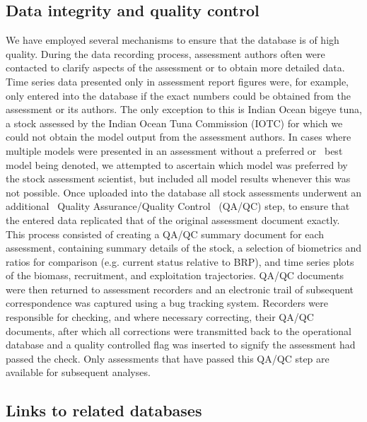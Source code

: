 \documentclass[letterpaper,review,authoryear,12pt]{elsarticle}
\begin{document}
\subsection*{Data integrity and quality control}
We have employed several mechanisms to ensure that the database is of
high quality. During the data recording process, assessment authors
often were contacted to clarify aspects of the assessment or to obtain
more detailed data. Time series data presented only in assessment
report figures were, for example, only entered into the database if
the exact numbers could be obtained from the assessment or its
authors. The only exception to this is Indian Ocean bigeye tuna, a
stock assessed by the Indian Ocean Tuna Commission (IOTC) for which we
could not obtain the model output from the assessment authors. In
cases where multiple models were presented in an assessment without a
preferred or ~best~ model being denoted, we attempted to ascertain
which model was preferred by the stock assessment scientist, but
included all model results whenever this was not possible.  Once
uploaded into the database all stock assessments underwent an
additional ~Quality Assurance/Quality Control~ (QA/QC) step, to ensure
that the entered data replicated that of the original assessment
document exactly. This process consisted of creating a QA/QC summary
document for each assessment, containing summary details of the stock,
a selection of biometrics and ratios for comparison (e.g. current
status relative to BRP), and time series plots of the biomass,
recruitment, and exploitation trajectories. QA/QC documents were then
returned to assessment recorders and an electronic trail of subsequent
correspondence was captured using a bug tracking system. Recorders
were responsible for checking, and where necessary correcting, their
QA/QC documents, after which all corrections were transmitted back to
the operational database and a quality controlled flag was inserted to
signify the assessment had passed the check. Only assessments that
have passed this QA/QC step are available for subsequent analyses.

\subsection*{Links to related databases}
\end{document}
